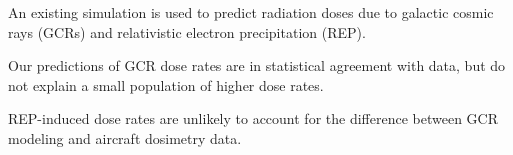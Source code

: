 \documentclass[draft]{agujournal2019}
\begin{document}

\begin{keypoints}
  \item An existing simulation is used to predict radiation doses due to galactic cosmic rays (GCRs) and relativistic electron precipitation (REP).
  \item Our predictions of GCR dose rates are in statistical agreement with data, but do not explain a small population of higher dose rates.
  \item REP-induced dose rates are unlikely to account for the difference between GCR modeling and aircraft dosimetry data.
\end{keypoints}

%
%

%
%

\end{document}
